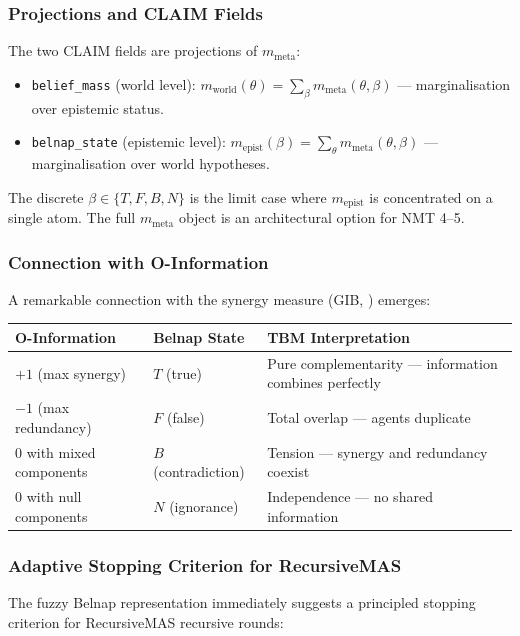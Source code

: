 \documentclass[11pt,a4paper]{article}
\theoremstyle{plain}
\theoremstyle{definition}
\theoremstyle{remark}
\begin{document}
\subsubsection{Projections and CLAIM Fields}

The two CLAIM fields are projections of $m_\text{meta}$:
\begin{itemize}[noitemsep]
\item \texttt{belief\_mass} (world level): $m_\text{world}(\theta) = \sum_\beta m_\text{meta}(\theta, \beta)$ --- marginalisation over epistemic status.
\item \texttt{belnap\_state} (epistemic level): $m_\text{epist}(\beta) = \sum_\theta m_\text{meta}(\theta, \beta)$ --- marginalisation over world hypotheses.
\end{itemize}
The discrete $\beta \in \{T, F, B, N\}$ is the limit case where $m_\text{epist}$
is concentrated on a single atom. The full $m_\text{meta}$ object is an
architectural option for NMT 4--5.

\subsubsection{Connection with O-Information}

A remarkable connection with the synergy measure (GIB, \cite{westphal2025}) emerges:

\begin{center}
\begin{tabular}{lll}
\toprule
O-Information & Belnap State & TBM Interpretation \\
\midrule
$+1$ (max synergy) & $T$ (true) & Pure complementarity --- information combines perfectly \\
$-1$ (max redundancy) & $F$ (false) & Total overlap --- agents duplicate \\
$0$ with mixed components & $B$ (contradiction) & Tension --- synergy and redundancy coexist \\
$0$ with null components & $N$ (ignorance) & Independence --- no shared information \\
\bottomrule
\end{tabular}
\end{center}

\subsubsection{Adaptive Stopping Criterion for RecursiveMAS}

The fuzzy Belnap representation immediately suggests a principled stopping
criterion for RecursiveMAS recursive rounds:
\end{document}
